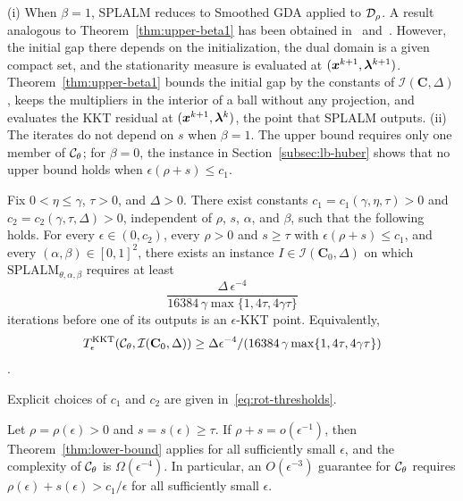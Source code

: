 \begin{remark}
\label{rem:upper-beta1}
(i) When \(\beta=1\), SPLALM reduces to Smoothed GDA applied to
\(\mathcal{D}_\rho\). A result analogous to Theorem~\ref{thm:upper-beta1} has been
obtained in~\cite[Theorem~3.4]{zhang2020smoothed}
and~\cite[Theorem~B.1]{li2026smoothing}. However, the initial gap there
depends on the initialization, the dual domain is a given compact set, and
the stationarity measure is evaluated at \((\bm{x}^{k+1},\bm{\lambda}^{k+1})\).
Theorem~\ref{thm:upper-beta1} bounds the initial gap by the constants of
\(\mathcal I(\mathbf C,\Delta)\), keeps the multipliers in the interior of a
ball without any projection, and evaluates the KKT residual at
\((\bm{x}^{k+1},\bm{\lambda}^k)\), the point that SPLALM outputs.
(ii) The iterates do not depend on \(s\) when \(\beta=1\). The upper bound
requires only one member of \(\mathcal{C}_\theta\); for \(\beta=0\), the instance
in Section~\ref{subsec:lb-huber} shows that no upper bound holds when
\(\epsilon(\rho+s)\le c_1\).
\end{remark}

\begin{theorem}
\label{thm:lower-bound}
Fix \(0<\eta\le\gamma\), \(\tau>0\), and \(\Delta>0\). There exist constants
\(c_1=c_1(\gamma,\eta,\tau)>0\) and \(c_2=c_2(\gamma,\tau,\Delta)>0\),
independent of \(\rho\), \(s\), \(\alpha\), and \(\beta\), such that the
following holds. For every \(\epsilon\in(0,c_2)\), every \(\rho>0\) and
\(s\ge\tau\) with \(\epsilon(\rho+s)\le c_1\), and every
\((\alpha,\beta)\in[0,1]^2\), there exists an instance
\(I\in\mathcal I(\mathbf C_0,\Delta)\) on which
\(\mathrm{SPLALM}_{\theta,\alpha,\beta}\) requires at least
\[
    \frac{\Delta\,\epsilon^{-4}}{16384\,\gamma\max\{1,4\tau,4\gamma\tau\}}
\]
iterations before one of its outputs is an \(\epsilon\)-KKT point.
Equivalently,
\[T^{\mathrm{KKT}}_\epsilon(\mathcal{C}_\theta,\mathcal I(\mathbf C_0,\Delta))
\ge\Delta\epsilon^{-4}/(16384\,\gamma\max\{1,4\tau,4\gamma\tau\})\].
\end{theorem}
Explicit choices of \(c_1\) and \(c_2\) are given in~\eqref{eq:rot-thresholds}.

\begin{corollary}
\label{cor:effective-penalty}
Let \(\rho=\rho(\epsilon)>0\) and \(s=s(\epsilon)\ge\tau\). If
\(\rho+s=o(\epsilon^{-1})\), then Theorem~\ref{thm:lower-bound} applies for
all sufficiently small \(\epsilon\), and the complexity of \(\mathcal{C}_\theta\)
is \(\Omega(\epsilon^{-4})\). In particular, an \(O(\epsilon^{-3})\)
guarantee for \(\mathcal{C}_\theta\) requires \(\rho(\epsilon)+s(\epsilon)>c_1/\epsilon\)
for all sufficiently small \(\epsilon\).
\end{corollary}
